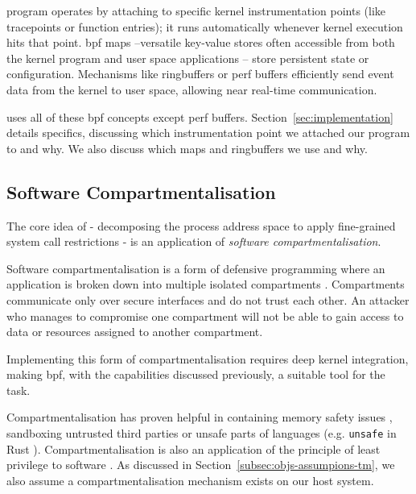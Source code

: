  program operates by attaching to specific kernel instrumentation
points (like tracepoints or function entries); it runs automatically
whenever kernel execution hits that point. \ac{bpf} maps --versatile key-value stores often accessible from both
the kernel program and user space applications -- store persistent state or configuration. Mechanisms like ringbuffers or perf buffers efficiently send
event data from the kernel to user space, allowing near real-time communication.

\af uses all of these \ac{bpf} concepts except perf buffers.
Section~\ref{sec:implementation} details specifics,
discussing which instrumentation point we attached our program to and why. We
also discuss which maps and ringbuffers we use and why.

\subsection{Software Compartmentalisation}

The core idea of \af{}- decomposing the process address space to apply 
fine-grained system call restrictions - is an application of \textit{software
compartmentalisation}.

Software compartmentalisation is a form of defensive programming where an application
is broken down into multiple isolated compartments \cite{SOK}. Compartments
communicate only over secure interfaces and do not trust each other. An
attacker who manages to compromise one compartment will not be able to gain
access to data or resources assigned to another compartment.  

Implementing this form of compartmentalisation requires deep kernel
integration, making \ac{bpf}, with the capabilities discussed previously, a 
suitable tool for the task.  

Compartmentalisation has proven helpful in containing memory safety issues
\cite{CONFFUZZ}, sandboxing untrusted third parties \cite{ANDROID_SOK} or
unsafe parts of languages \cite{MPK} (e.g. \texttt{unsafe} in Rust 
\cite{rustbook_unsafe}). Compartmentalisation is also an application of the
principle of least privilege to software \cite{PRIVMAN}. As discussed in 
Section~\ref{subsec:objs-assumpions-tm}, we also assume a compartmentalisation
mechanism exists on our host system.

